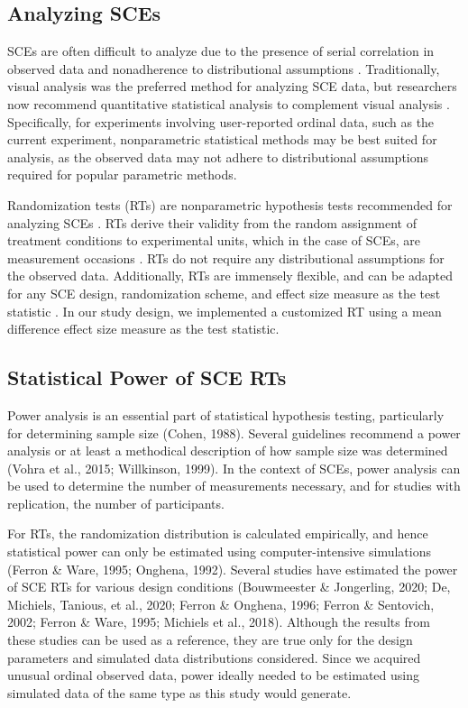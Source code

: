 \documentclass{article}
\begin{document}
\subsection{Analyzing SCEs}

SCEs are often difficult to analyze due to the presence of serial correlation in observed data and nonadherence to distributional assumptions \autocite{bib26}\autocite{bib27}\autocite{bib28}\autocite{bib29}. Traditionally, visual analysis was the preferred method for analyzing SCE data, but researchers now recommend quantitative statistical analysis to complement visual analysis \autocite{bib30}\autocite{bib31}\autocite{bib32}\autocite{bib33}\autocite{bib34}. Specifically, for experiments involving user-reported ordinal data, such as the current experiment, nonparametric statistical methods may be best suited for analysis, as the observed data may not adhere to distributional assumptions required for popular parametric methods. 

Randomization tests (RTs) are nonparametric hypothesis tests recommended for analyzing SCEs \autocite{bib35}\autocite{bib36}\autocite{bib37}. RTs derive their validity from the random assignment of treatment conditions to experimental units, which in the case of SCEs, are measurement occasions \autocite{bib38}. RTs do not require any distributional assumptions for the observed data. Additionally, RTs are immensely flexible, and can be adapted for any SCE design, randomization scheme, and effect size measure as the test statistic \autocite{bib39}\autocite{bib40}\autocite{bib41}. In our study design, we implemented a customized RT using a mean difference effect size measure as the test statistic. 

\subsection{Statistical Power of SCE RTs }

Power analysis is an essential part of statistical hypothesis testing, particularly for determining sample size (Cohen, 1988). Several guidelines recommend a power analysis or at least a methodical description of how sample size was determined (Vohra et al., 2015; Willkinson, 1999). In the context of SCEs, power analysis can be used to determine the number of measurements necessary, and for studies with replication, the number of participants.

For RTs, the randomization distribution is calculated empirically, and hence statistical power can only be estimated using computer-intensive simulations (Ferron \& Ware, 1995; Onghena, 1992). Several studies have estimated the power of SCE RTs for various design conditions (Bouwmeester \& Jongerling, 2020; De, Michiels, Tanious, et al., 2020; Ferron \& Onghena, 1996; Ferron \& Sentovich, 2002; Ferron \& Ware, 1995; Michiels et al., 2018). Although the results from these studies can be used as a reference, they are true only for the design parameters and simulated data distributions considered. Since we acquired unusual ordinal observed data, power ideally needed to be estimated using simulated data of the same type as this study would generate.
\end{document}

